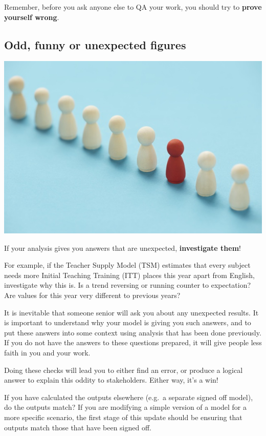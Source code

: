 \documentclass[
]{article}
\begin{document}
Remember, before you ask anyone else to QA your work, you should try to \textbf{prove yourself wrong}.

\hypertarget{odd-funny-or-unexpected-figures}{%
\subsection{Odd, funny or unexpected figures}\label{odd-funny-or-unexpected-figures}}

\includegraphics{pictures/outlier_pic.jpg}

If your analysis gives you answers that are unexpected, \textbf{investigate them}!

For example, if the Teacher Supply Model (TSM) estimates that every subject needs more Initial Teaching Training (ITT) places this year apart from English, investigate why this is. Is a trend reversing or running counter to expectation? Are values for this year very different to previous years?

It is inevitable that someone senior will ask you about any unexpected results. It is important to understand why your model is giving you such answers, and to put these answers into some context using analysis that has been done previously. If you do not have the answers to these questions prepared, it will give people less faith in you and your work.

Doing these checks will lead you to either find an error, or produce a logical answer to explain this oddity to stakeholders. Either way, it's a win!

If you have calculated the outputs elsewhere (e.g.~a separate signed off model), do the outputs match? If you are modifying a simple version of a model for a more specific scenario, the first stage of this update should be ensuring that outputs match those that have been signed off.
\end{document}
